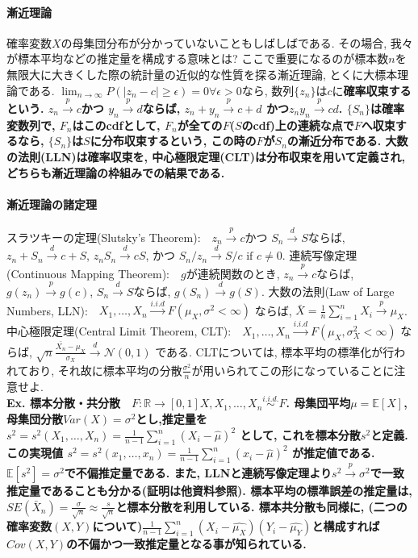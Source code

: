 \documentclass[paper=a4paper,fontsize=10pt]{jlreq}
\begin{document}
\paragraph{漸近理論}
確率変数$X$の母集団分布が分かっていないこともしばしばである. その場合, 我々が標本平均などの推定量を構成する意味とは? ここで重要になるのが標本数$n$を無限大に大きくした際の統計量の近似的な性質を探る漸近理論, とくに大標本理論である. $\lim_{n \to \infty} P(\left\lvert z_n - c \right\rvert \geq \epsilon) = 0　\forall \epsilon>0$なら, 数列$\{z_n\}$は$c$に\rmfamily\mcfamily\bfseries{確率収束}\mdseries するという. $z_n \overset{p}{\to} c$かつ $y_n \overset{p}{\to} d$ならば, $z_n + y_n \overset{p}{\to} c+d$ かつ$z_n y_n \overset{p}{\to} c d$. $\{S_n\}$は確率変数列で, $F_n$はこのcdfとして, $F_n$が全ての$F$($S$のcdf)上の連続な点で$F$へ収束するなら, $\{S_n\}$は$S$に\rmfamily\mcfamily\bfseries{分布収束}\mdseries するという, この時の$F$が$S_n$の\rmfamily\mcfamily\bfseries{漸近分布}\mdseries である. 大数の法則(LLN)は確率収束を, 中心極限定理(CLT)は分布収束を用いて定義され, どちらも漸近理論の枠組みでの結果である.\\

\paragraph{漸近理論の諸定理}
スラツキーの定理(Slutsky's Theorem):　$z_n \overset{p}{\to} c$かつ $S_n \overset{d}{\to} S$ならば, $z_n + S_n \overset{d}{\to} c+S$, $z_n S_n \overset{d}{\to} c S$, かつ $S_n / z_n \overset{d}{\to} S / c \text{ if }c\neq0$. 連続写像定理(Continuous Mapping Theorem):　$g$が連続関数のとき, $z_n \overset{p}{\to} c$ならば, $g(z_n) \overset{p}{\to} g(c)$, $S_n \overset{d}{\to} S$ならば, $g(S_n) \overset{d}{\to} g(S)$. 大数の法則(Law of Large Numbers, LLN):　$X_1,\dots, X_n \overset{i.i.d}{\to} F(\mu_X, \sigma^2<\infty)$ ならば, $\bar{X}=\frac{1}{n}\sum_{i = 1}^{n} X_i \overset{p}{\to} \mu_X $. 中心極限定理(Central Limit Theorem, CLT):　$X_1,\dots, X_n \overset{i.i.d}{\to} F(\mu_X, \sigma_X^2<\infty)$ ならば, $\sqrt{n} \frac{\bar{X_n}-\mu_{X}}{\sigma_X} \overset{d}{\to} \mathcal{N}(0, 1)$ である. CLTについては, 標本平均の標準化が行われており, それ故に標本平均の分散$\frac{\sigma^2}{n}$が用いられてこの形になっていることに注意せよ. \\

\rmfamily\mcfamily\bfseries{Ex. 標本分散・共分散}\mdseries　$F:\mathbb{R}\rightarrow[0, 1]　X, X_1, \dots, X_n \overset{i.i.d.}{\sim}F$. 母集団平均$\mu=\mathbb{E} [X]$, 母集団分散$Var(X)=\sigma^2$とし,\rmfamily\mcfamily\bfseries{推定量}\mdseries を $ s^2 = s^2(X_1, \dots, X_n)=\frac{1}{n-1}\sum_{i = 1}^{n}(X_i-\hat{\mu})^2$ として, これを標本分散$s^2$と定義. この実現値 $ s^2 = s^2(x_1, \dots, x_n)=\frac{1}{n-1}\sum_{i = 1}^{n}(x_i-\hat{\mu})^2$ が推定値である. $\mathbb{E}[s^2]=\sigma^2$で不偏推定量である. また, LLNと連続写像定理より$s^2 \overset{p}{\to} \sigma^2$で一致推定量であることも分かる(証明は他資料参照). 標本平均の標準誤差の推定量は, $SE(\bar{X}_n)=\frac{\sigma}{\sqrt{n}} \approx \frac{s}{\sqrt{n}}$と標本分散を利用している. 標本共分散も同様に, (二つの確率変数$(X,Y)$について)$\frac{1}{n-1}\sum_{i = 1}^{n}(X_i-\hat{\mu_X})(Y_i-\hat{\mu_Y})$と構成すれば$Cov(X,Y)$の不偏かつ一致推定量となる事が知られている. \\
\end{document}
